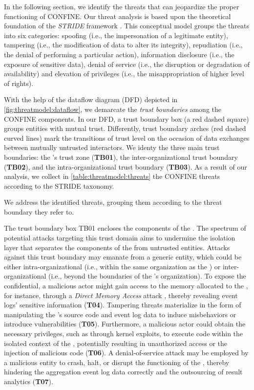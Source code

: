 \begin{newj}
	

In the following section, we identify the threats that can jeopardize the proper functioning of CONFINE. Our threat analysis is based upon the theoretical foundation of the \textit{STRIDE} framework \cite{DBLP:journals/re/ScandariatoWJ15}. This conceptual model groups the threats into six categories: spoofing (i.e., the impersonation of a legitimate entity), tampering (i.e., the modification of data to alter its integrity), repudiation (i.e., the denial of performing a particular action), information disclosure (i.e., the exposure of sensitive data), denial of service (i.e., the disruption or degradation of availability) and elevation of privileges (i.e., the misappropriation of higher level of rights). 

With the help of the dataflow diagram (DFD) depicted in \cref{fig:threatmodel:dataflow}, we demarcate the \textit{trust boundaries} among the CONFINE components. In our DFD, a trust boundary box (a red dashed square) groups entities with mutual trust. Differently, trust boundary arches (red dashed curved lines) mark the transitions of trust level on the occasion of data exchanges between mutually untrusted interactors. We identy the three main trust boundaries: the 's trust zone (\textbf{TB01}), the inter-organizational trust boundary (\textbf{TB02}), and the intra-organizational trust boundary (\textbf{TB03}). As a result of our analysis, we collect in \cref{table:threatmodel:threats} the CONFINE threats according to the STRIDE taxonomy.

We address the identified threats, grouping them according to the threat boundary they refer to.  
	

The trust boundary box TB01 encloses the components of the . The spectrum of potential attacks targeting this trust domain aims to undermine the isolation layer that separates the components of the  from untrusted entities. Attacks against this trust boundary may emanate from a generic entity, which could be either intra-organizational (i.e., within the same organization as the ) or inter-organizational (i.e., beyond the boundaries of the 's organization). To expose the confidential, a malicious actor might gain access to the memory allocated to the , for instance, through a \textit{Direct Memory Access} attack \cite{DBLP:conf/cms/EckertPK13}, thereby revealing event logs' sensitive information (\textbf{T04}). Tampering threats materialize in the form of manipulating the 's source code and event log data to induce misbehaviors or introduce vulnerabilities (\textbf{T05}). Furthermore, a malicious actor could obtain the necessary privileges, such as through kernel exploits, to execute code within the isolated context of the , potentially resulting in unauthorized access or the injection of malicious code (\textbf{T06}). A denial-of-service attack may be employed by a malicious entity to crash, halt, or disrupt the functioning of the , thereby hindering the aggregation event log data correctly and the outsourcing of result analytics (\textbf{T07}). 


\end{newj}
